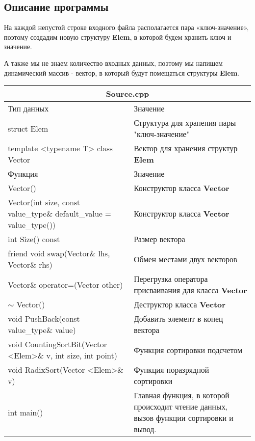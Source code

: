 \documentclass[12pt]{article}
\begin{document}
\subsection*{Описание программы}

На каждой непустой строке входного файла располагается пара «ключ-значение»,
поэтому создадим новую структуру \textbf{Elem}, в которой будем хранить ключ и значение.

А также мы не знаем количество входных данных, поэтому мы напишем динамический массив - вектор, в который будут помещаться структуры 
\textbf{Elem}.
\begin{table}[!htb]
\begin{tabular}{|m{8cm}|m{8cm}|}
\hline
\multicolumn{2}{|c|}{Source.cpp} \\ 
\hline
\cellcolor{gray!25} Тип данных       & \cellcolor{gray!25} Значение\\ 
\hline
struct Elem & Структура для хранения пары "ключ-значение" \\ 
\hline
template <typename T> class Vector & Вектор для хранения структур \textbf{Elem}\\
\hline
\cellcolor{gray!25} Функция & \cellcolor{gray!25}Значение\\
\hline
Vector() & Конструктор класса \textbf{Vector} \\
\hline
Vector(int size, const value\_type\& default\_value = value\_type()) & Конструктор класса \textbf{Vector} \\
\hline
int Size() const & Размер вектора \\
\hline
friend void swap(Vector\& lhs, Vector\& rhs) & Обмен местами двух векторов\\
\hline
Vector\& operator=(Vector other) & Перегрузка оператора присваивания для класса \textbf{Vector}\\
\hline
$\sim$ Vector() & Деструктор класса \textbf{Vector} \\
\hline
void PushBack(const value\_type\& value) & Добавить элемент в конец вектора\\
\hline
void CountingSortBit(Vector <Elem>\& v, int size, int point) & Функция сортировки подсчетом\\
\hline
void RadixSort(Vector <Elem>\& v) & Функция поразрядной сортировки\\
\hline
int main() & Главная функция, в которой происходит чтение данных, вызов функции сортировки и вывод. \\
\hline
\end{tabular}
\end{table}
\end{document}
